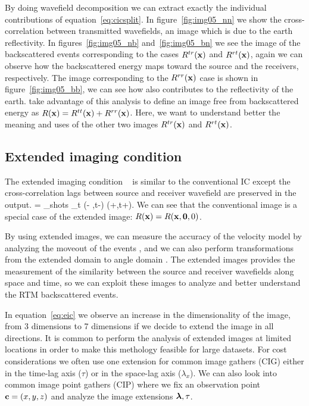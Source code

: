 By doing wavefield decomposition we can extract exactly the individual contributions of equation~\ref{eq:cicsplit}. In 
figure~\ref{fig:img05_nn} we show the cross-correlation between transmitted wavefields, an image which is due to the
earth reflectivity. In figures~\ref{fig:img05_nb} and~\ref{fig:img05_bn} we see the image of the backscattered
events corresponding to the cases $R^{tr}({\bf x})$ and $R^{rt}({\bf x})$, again we can observe how the backscattered energy
maps toward the source and the receivers, respectively. The image corresponding to the $R^{rr}({\bf x})$ case is shown in 
figure~\ref{fig:img05_bb}, we can see how also contributes to the reflectivity of the earth. \cite{fei:3130} take 
advantage of this analysis to define an image free from backscattered energy as $R({\bf x})=R^{tt}({\bf x})+R^{rr}({\bf x})$. Here,
we want to understand better the meaning and uses of the other two images $R^{tr}({\bf x})$ and $R^{rt}({\bf x})$.


\subsection{Extended imaging condition}

The extended imaging condition ~\citep{sava:S209} is similar to the conventional IC except the cross-correlation
lags between source and receiver wavefield are preserved in the output.
\beq
\Re= \sum_{shots} \sum_{t} \US(\xx - \hh,t-\tau) \UR(\xx+\hh,t+\tau).
\label{eq:eic}
\eeq
%
We can see that the conventional image is a special case of the extended image: $R({\bf x})=R({\bf x},{\bf 0},0)$.

By using extended images, we can measure the accuracy of the velocity model by analyzing the moveout of the events
 \citep{yang:S151}, and we can also perform transformations from the extended domain to angle domain 
\citep{sava:S209,sava:1065,sava:S131}. The extended  images provides the measurement of the similarity between the source
 and receiver wavefields along space and time, so we can exploit these images to analyze and better understand the RTM backscattered events.

In equation~\ref{eq:eic} we observe an increase in the dimensionality of the image, from 3 dimensions to 7 dimensions
if we decide to extend the image in all directions. It is common to perform the analysis 
of extended images at limited locations in order to make this methology feasible for large datasets. 
For cost considerations we often use one extension for common image gathers (CIG) either
in the time-lag axis ($\tau$) or in the space-lag axis ($\lambda_x$). We can also look into common image point gathers (CIP) where we 
fix an observation point ${\bf c}=(x,y,z)$ and analyze the image extensions ${\boldsymbol{\lambda}},\tau$. 

